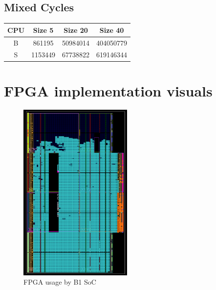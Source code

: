 \subsection{Mixed Cycles}
\begin{center}
        \begin{tabular}{c c c c}
            \hline
            CPU & Size 5 & Size 20 & Size 40 \\
            \hline
            B & 861195 & 50984014 & 404050779 \\
            \hline
            S & 1153449 & 67738822 & 619146344 \\
            \hline
        \end{tabular}
\end{center}

\section{FPGA implementation visuals}
\begin{figure}[H]
    \centering
    \includegraphics[width=0.5\textwidth]{img/b1_impl.png}
    \caption{FPGA usage by B1 SoC}
    \label{fig:b1_fpga}
\end{figure}

